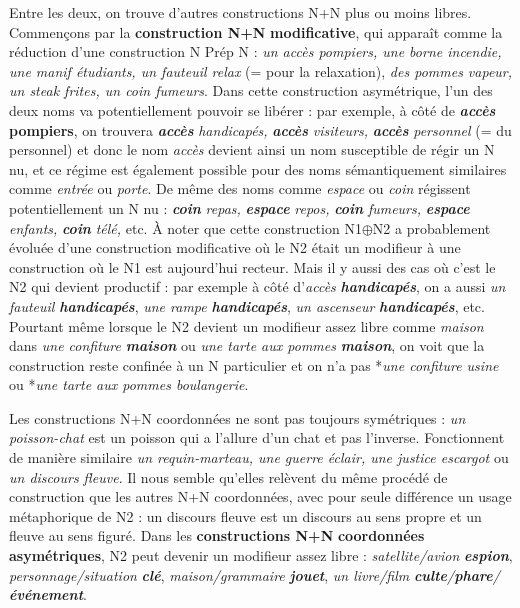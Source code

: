 {    Entre les deux, on trouve d’autres constructions N+N plus ou moins libres. Commençons par la \textbf{construction N+N} \textbf{modificative}, qui apparaît comme la réduction d’une construction N Prép N : \textit{un accès pompiers, une borne incendie, une manif étudiants, un fauteuil relax} (= pour la relaxation), \textit{des pommes vapeur, un steak frites, un coin fumeurs}. Dans cette construction asymétrique, l’un des deux noms va potentiellement pouvoir se libérer : par exemple, à côté de \textbf{\textit{accès}  pompiers}, on trouvera \textbf{\textit{accès}} \textit{handicapés,} \textbf{\textit{accès}} \textit{visiteurs,} \textbf{\textit{accès}} \textit{personnel} (= du personnel) et donc le nom \textit{accès} devient ainsi un nom susceptible de régir un N nu, et ce régime est également possible pour des noms sémantiquement similaires comme \textit{entrée} ou \textit{porte}. De même des noms comme \textit{espace} ou \textit{coin} régissent potentiellement un N nu : \textbf{\textit{coin}} \textit{repas,} \textbf{\textit{espace}} \textit{repos,} \textbf{\textit{coin}} \textit{fumeurs,} \textbf{\textit{espace}} \textit{enfants,} \textbf{\textit{coin}} \textit{télé,} etc. À noter que cette construction N1\textrm{${\oplus}$}N2 a probablement évoluée d’une construction modificative où le N2 était un modifieur à une construction où le N1 est aujourd’hui recteur. Mais il y aussi des cas où c’est le N2 qui devient productif : par exemple à côté d’\textit{accès} \textbf{\textit{handicapés}}, on a aussi \textit{un fauteuil} \textbf{\textit{handicapés}}, \textit{une rampe} \textbf{\textit{handicapés}}, \textit{un ascenseur} \textbf{\textit{handicapés}}, etc. Pourtant même lorsque le N2 devient un modifieur assez libre comme \textit{maison} dans \textit{une confiture} \textbf{\textit{maison}} ou \textit{une tarte aux pommes} \textbf{\textit{maison}}, on voit que la construction reste confinée à un N particulier et on n’a pas *\textit{une confiture usine} ou *\textit{une tarte aux pommes boulangerie}.

    Les constructions N+N coordonnées ne sont pas toujours symétriques : \textit{un poisson-chat} est un poisson qui a l’allure d’un chat et pas l’inverse. Fonctionnent de manière similaire \textit{un requin-marteau, une guerre éclair, une justice escargot} ou \textit{un discours fleuve}. Il nous semble qu’elles relèvent du même procédé de construction que les autres N+N coordonnées, avec pour seule différence un usage métaphorique de N2 : un discours fleuve est un discours au sens propre et un fleuve au sens figuré. Dans les \textbf{constructions N+N} \textbf{coordonnées asymétriques}, N2 peut devenir un modifieur assez libre : \textit{satellite/avion} \textbf{\textit{espion}}, \textit{personnage/situation} \textbf{\textit{clé}}, \textit{maison/grammaire} \textbf{\textit{jouet}}, \textit{un livre/film} \textbf{\textit{culte}}\textit{/}\textbf{\textit{phare}}\textit{/}\textbf{\textit{événement}}.

}

